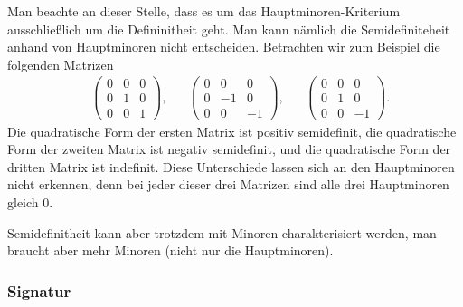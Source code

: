 Man beachte an dieser Stelle, dass es um das  Hauptminoren-Kriterium ausschließlich um die Defininitheit geht. Man kann nämlich die Semidefiniteheit anhand von Hauptminoren nicht entscheiden. Betrachten wir zum Beispiel die folgenden Matrizen
\begin{align*}
	&
	\begin{pmatrix}
			0 & 0 & 0
			\\ 0 & 1 & 0
			\\ 0 & 0 & 1 
	\end{pmatrix}, 
	&
	&
\begin{pmatrix}
	0 & 0 & 0
	\\ 0 & -1 & 0
	\\ 0 & 0 & -1 
\end{pmatrix},
	&
	&
\begin{pmatrix}
	0 & 0 & 0
	\\ 0 & 1 & 0
	\\ 0 & 0 & -1 
\end{pmatrix}.
\end{align*}
Die quadratische Form der ersten Matrix ist positiv semidefinit, die quadratische Form der zweiten Matrix ist negativ semidefinit, und die quadratische Form der dritten Matrix ist indefinit. Diese Unterschiede lassen sich an den Hauptminoren nicht erkennen, denn bei jeder dieser drei Matrizen sind alle drei Hauptminoren gleich $0$. 

Semidefinitheit kann aber trotzdem mit Minoren charakterisiert werden, man braucht aber mehr Minoren (nicht nur die Hauptminoren). 

\subsubsection{Signatur} 

